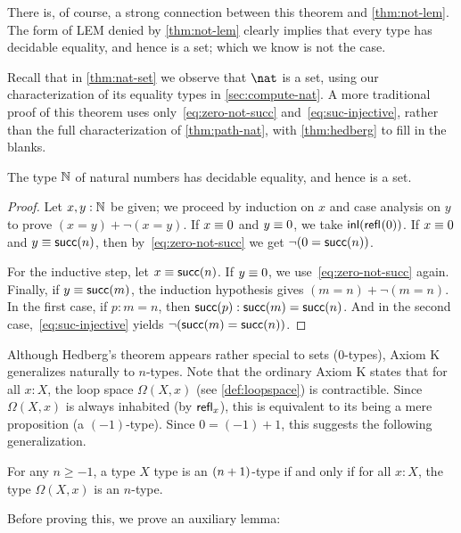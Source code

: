 There is, of course, a strong connection between this theorem and \autoref{thm:not-lem}.
The form of LEM denied by \autoref{thm:not-lem} clearly implies that every type has decidable equality, and hence is a set; which we know is
not the case.

Recall that in \autoref{thm:nat-set} we observe that $\nat$ is a set, using our characterization of its equality types in
\autoref{sec:compute-nat}.
A more traditional proof of this theorem uses only~\eqref{eq:zero-not-succ} and~\eqref{eq:suc-injective}, rather than the full
characterization of \autoref{thm:path-nat}, with \autoref{thm:hedberg} to fill in the blanks.

\begin{thm}\label{prop:nat-is-set}
 The type $\mathbb{N}$ of natural numbers has decidable equality, and hence is a set.
\end{thm}

\begin{proof}
  Let $x, y : \mathbb{N}$ be given; we proceed by induction on $x$ and case analysis on $y$ to prove $(x=y)+\neg(x=y)$.
  If $x \equiv 0$ and $y \equiv 0$, we take ${\mathsf{inl}}(\mathsf{refl}_{}(0))$.
  If $x \equiv 0$ and $y \equiv \mathsf{succ}(n)$, then by~\eqref{eq:zero-not-succ} we get $\neg (0 = \mathsf{succ} (n))$.

  For the inductive step, let $x \equiv \mathsf{succ} (n)$.
  If $y \equiv 0$, we use~\eqref{eq:zero-not-succ} again.
  Finally, if $y \equiv \mathsf{succ} (m)$, the induction hypothesis gives $(m = n)+\neg(m = n)$.
  In the first case, if $p:m=n$, then ${\mathsf{succ}}({p}):\mathsf{succ}(m)=\mathsf{succ}(n)$.
  And in the second case,~\eqref{eq:suc-injective} yields $\neg(\mathsf{succ}(m)=\mathsf{succ}(n))$.
\end{proof}

Although Hedberg's theorem appears rather special to sets ($0$-types), Axiom K generalizes naturally to $n$-types.
Note that the ordinary Axiom K states that for all $x:X$, the loop space $\Omega(X,x)$ (see \cref{def:loopspace}) is contractible.
Since $\Omega(X,x)$ is always inhabited (by $\mathsf{refl}_{x}$), this is equivalent to its being a mere proposition (a $(-1)$-type).
Since $0 = (-1)+1$, this suggests the following generalization.

\begin{thm}\label{thm:hlevel-loops}
  For any $n\geq -1$, a type $X$ type is an $(n+1)$-type if and only if for all $x : X$, the type $\Omega(X, x)$ is an $n$-type.
\end{thm}

Before proving this, we prove an auxiliary lemma:

